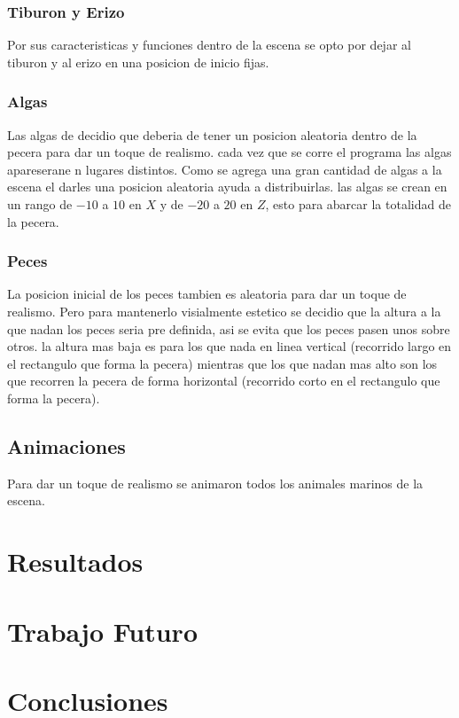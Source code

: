 \documentclass[10pt, a4paper, twocolumn]{article}
\begin{document}
\subsubsection{Tiburon y Erizo}
Por sus caracteristicas y funciones dentro de la escena se opto por dejar al tiburon y al erizo en una posicion de inicio fijas.

\subsubsection{Algas}
Las algas de decidio que deberia de tener un posicion aleatoria dentro de la pecera para dar un toque de realismo. cada vez que se corre el programa las algas apareserane n lugares distintos. Como se agrega una gran cantidad de algas a la escena el darles una posicion aleatoria ayuda a distribuirlas. las algas se crean en un rango de $-10$ a $10$ en $X$ y de $-20$ a $20$ en $Z$, esto para abarcar la totalidad de la pecera.

\subsubsection{Peces}
La posicion inicial de los peces tambien es aleatoria para dar un toque de realismo. Pero para mantenerlo visialmente estetico se decidio que la altura a la que nadan los peces seria pre definida, asi se evita que los peces pasen unos sobre otros. la altura mas baja es para los que nada en linea vertical (recorrido largo en el rectangulo que forma la pecera) mientras que los que nadan mas alto son los que recorren la pecera de forma horizontal (recorrido corto en el rectangulo que forma la pecera).

\subsection{Animaciones}
Para dar un toque de realismo se animaron todos los animales marinos de la escena.



\section{Resultados}

\section{Trabajo Futuro}

\section{Conclusiones}

\printbibliography[{title = "example.bib" }] %

\end{document}
